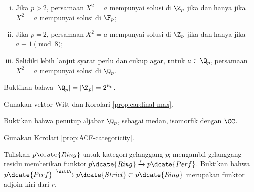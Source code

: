 \begin{Exercises}
\begin{enumerate}[(i)]
			\item Jika $p > 2$, persamaan $X^2=a$ mempunyai solusi di $\Z_p$ jika dan hanya jika $X^2=\bar{a}$ mempunyai solusi di $\F_p$;
			\item Jika $p=2$, persamaan $X^2=a$ mempunyai solusi di $\Z_p$ jika dan hanya jika $a \equiv 1 \pmod 8$;
			\item Selidiki lebih lanjut syarat perlu dan cukup agar, untuk $a \in \Q_p$, persamaan $X^2=a$ mempunyai solusi di $\Q_p$.
		\end{enumerate}
	\item Buktikan bahwa $|\Q_p| = |\Z_p| = 2^{\aleph_0}$. \begin{hint}Gunakan vektor Witt dan Korolari \ref{prop:cardinal-max}.\end{hint}
	\item Buktikan bahwa penutup aljabar $\Q_p$, sebagai medan, isomorfik dengan $\CC$. \begin{hint}Gunakan Korolari \ref{prop:ACF-categoricity}.\end{hint}
	\item Tuliskan $p\dcate{Ring}$ untuk kategori gelanggang-$p$; mengambil gelanggang residu memberikan funktor $p\dcate{Ring} \xrightarrow{r} p\dcate{Perf}$. Buktikan bahwa $p\dcate{Perf} \xrightarrow{\WittV} p\dcate{Strict} \subset p\dcate{Ring}$ merupakan funktor adjoin kiri dari $r$.
\end{Exercises}
